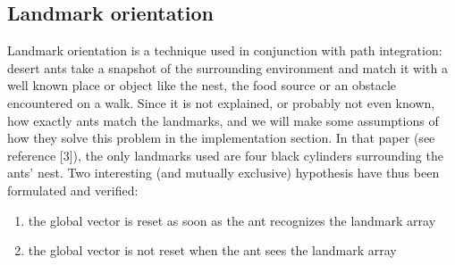 \documentclass[11pt]{article}
\begin{document}
\subsection{Landmark orientation}

Landmark orientation is a technique used in conjunction with path integration: desert ants take a snapshot of the surrounding environment and match it with a well known place or object like the nest, the food source or an obstacle encountered on a walk. Since it is not explained, or probably not even known, how exactly ants match the landmarks, and we will make some assumptions of how they solve this problem in the implementation section. In that paper (see reference [3]), the only landmarks used are four black cylinders surrounding the ants' nest. Two interesting (and mutually exclusive) hypothesis have thus been formulated and verified:
\begin{enumerate}
\item the global vector is reset as soon as the ant recognizes the landmark array
\item the global vector is not reset when the ant sees the landmark array
\end{enumerate}
\end{document}
